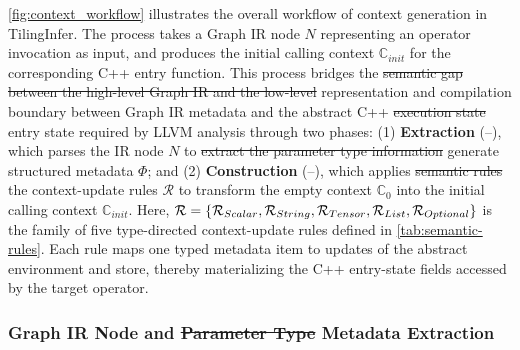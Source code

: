 \documentclass[manuscript,screen,review]{acmart}
\theoremstyle{indenteditalic}
\providecommand{\DIFaddtex}[1]{{\protect\color{blue}#1}} %
\providecommand{\DIFidentity}[1]{#1}
\providecommand{\DIFdeltex}[1]{{%
  \protect\color{red}%
  \normalfont\normalsize
  \let\textbf\DIFidentity
  \let\textit\DIFidentity
  \let\texttt\DIFidentity
  \let\textsc\DIFidentity
  \let\textsf\DIFidentity
  \let\emph\DIFidentity
  \let\uline\DIFidentity
  \sout{#1}%
}} %
\providecommand{\DIFaddbegin}{} %
\providecommand{\DIFaddend}{} %
\providecommand{\DIFdelbegin}{} %
\providecommand{\DIFdelend}{} %
\providecommand{\DIFadd}[1]{\texorpdfstring{\DIFaddtex{#1}}{#1}} %
\providecommand{\DIFdel}[1]{\texorpdfstring{\DIFdeltex{#1}}{}} %
\begin{document}
\autoref{fig:context_workflow} illustrates the overall workflow of context generation in TilingInfer.
The process takes a Graph IR node $N$ representing an operator invocation as input, and produces the initial calling context $\mathbb{C}_{init}$ for the corresponding C++ entry function.
This process bridges the \DIFdelbegin \DIFdel{semantic gap between the high-level Graph IR and the low-level }\DIFdelend \DIFaddbegin \DIFadd{representation and compilation boundary between Graph IR metadata and the abstract }\DIFaddend C++ \DIFdelbegin \DIFdel{execution state }\DIFdelend \DIFaddbegin \DIFadd{entry state required by LLVM analysis }\DIFaddend through two phases:
(1) \textbf{Extraction} (--), which parses the IR node $N$ to \DIFdelbegin \DIFdel{extract the parameter type information }\DIFdelend \DIFaddbegin \DIFadd{generate structured metadata }\DIFaddend $\Phi$; and
(2) \textbf{Construction} (--), which applies \DIFdelbegin \DIFdel{semantic rules }\DIFdelend \DIFaddbegin \DIFadd{the context-update rules $\mathcal{R}$ }\DIFaddend to transform the empty context $\mathbb{C}_0$ into the initial calling context $\mathbb{C}_{init}$.
\DIFaddbegin \DIFadd{Here, $\mathcal{R} = \{\mathcal{R}_{\textsc{Scalar}}, \mathcal{R}_{\textsc{String}}, \mathcal{R}_{\textsc{Tensor}}, \mathcal{R}_{\textsc{List}}, \mathcal{R}_{\textsc{Optional}}\}$ is the family of five type-directed context-update rules defined in }\autoref{tab:semantic-rules}\DIFadd{.
Each rule maps one typed metadata item to updates of the abstract environment and store, thereby materializing the C++ entry-state fields accessed by the target operator.
}\DIFaddend 

\subsubsection{Graph IR Node and \DIFdelbegin \DIFdel{Parameter Type }\DIFdelend \DIFaddbegin \DIFadd{Metadata }\DIFaddend Extraction}\label{sec:design:extract}
\end{document}
